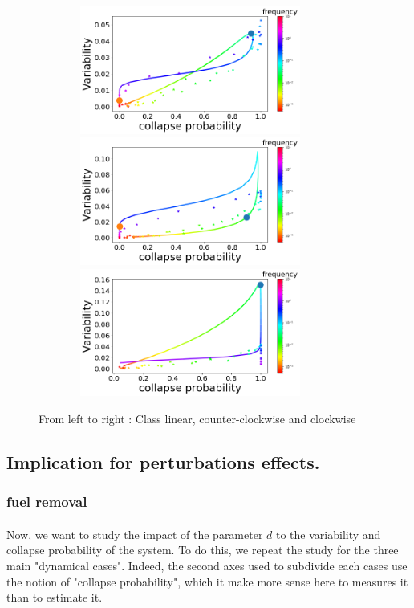 \documentclass{article}
\begin{document}
\begin{figure}[h!]
\begin{center}
\includegraphics[width=10cm, height = 4.2cm]{case_linear.png}
\includegraphics[width=10cm, height = 4.2cm]{case_triangular.png}
\includegraphics[width=10cm, height = 4.2cm]{case_clockwise.png}
\end{center}
\caption{\label{fig:temp}From left to right : Class linear, counter-clockwise and clockwise} %
\end{figure}



\newpage
\subsection{Implication for perturbations effects.}


\subsubsection{fuel removal}

\paragraph{}
Now, we want to study the impact of the parameter $d$ to the variability and collapse probability of the system. To do this, we repeat the study for the three main "dynamical cases". Indeed, the second axes used to subdivide each cases use the notion of "collapse probability", which it make more sense here to measures it than to estimate it. 
\end{document}

